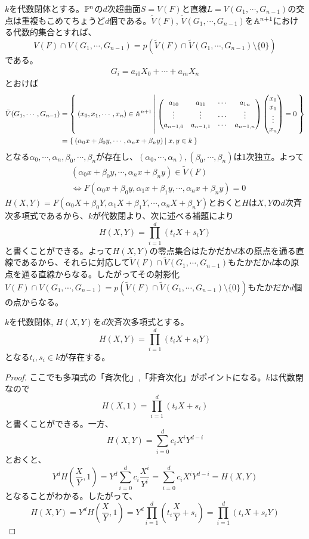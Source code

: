 \documentclass{ltjsreport}
\begin{document}
\begin{eg}
  $k$を代数閉体とする。$\mathbb{P}^n$の$d$次超曲面$S=V(F)$と直線$L=V(G_1,\cdots,G_{n-1})$の交点は重複もこめてちょうど$d$個である。$\tilde{V}(F)$, $\tilde{V}(G_1,\cdots,G_{n-1})$を$\mathbb{A}^{n+1}$における代数的集合とすれば、
  \[
  V(F)\cap V(G_1,\cdots,G_{n-1})=p(\tilde{V}(F)\cap\tilde{V}(G_1,\cdots,G_{n-1})\setminus\{0\})  
  \]
  である。
  \begin{align*}
  G_i=a_{i0}X_0+\cdots+a_{in}X_n  
  \end{align*}
  とおけば
  \begin{align*}
    \tilde{V}(G_1,\cdots,G_{n-1})&=\left\{\:(x_0,x_1,\cdots,x_n)\in \mathbb{A}^{n+1}\:\middle|\:\begin{pmatrix} 
      a_{10} & a_{11} & \cdots & a_{1n}\\
      \vdots & \vdots & \cdots & \vdots \\
      a_{n-1,0} & a_{n-1,1} & \cdots & a_{n-1,n}
       \end{pmatrix}\begin{pmatrix} x_0\\x_1\\\vdots\\x_n \end{pmatrix}=0\:\right\}\\
    &=\left\{\:(\alpha_0x+\beta_0 y,\cdots,\alpha_nx+\beta_ny)\:\middle|\:x,y\in k\:\right\}
  \end{align*}
  となる$\alpha_0,\cdots,\alpha_n,\beta_0,\cdots,\beta_n$が存在し、$(\alpha_0,\cdots,\alpha_n), (\beta_0,\cdots,\beta_n)$は1次独立。よって
  \begin{align*}
    &(\alpha_0x+\beta_0 y,\cdots,\alpha_nx+\beta_ny)\in \tilde{V}(F)\\
    &\Leftrightarrow F(\alpha_0x+\beta_0y,\alpha_1x+\beta_1y,\cdots,\alpha_nx+\beta_ny)=0
  \end{align*}
  $H(X,Y)=F(\alpha_0X+\beta_0Y,\alpha_1X+\beta_1Y,\cdots,\alpha_nX+\beta_nY)$とおくと$H$は$X,Y$の$d$次斉次多項式であるから、$k$が代数閉より、次に述べる補題により
  \[
  H(X,Y)=\prod_{i=1}^d(t_iX+s_iY)  
  \]
  と書くことができる。よって$H(X,Y)$の零点集合はたかだか$d$本の原点を通る直線であるから、それらに対応して$\tilde{V}(F)\cap\tilde{V}(G_1,\cdots,G_{n-1})$もたかだか$d$本の原点を通る直線からなる。したがってその射影化$V(F)\cap V(G_1,\cdots,G_{n-1})=p(\tilde{V}(F)\cap\tilde{V}(G_1,\cdots,G_{n-1})\setminus\{0\})$もたかだか$d$個の点からなる。
\end{eg}

\begin{lemm}
  $k$を代数閉体, $H(X,Y)$を$d$次斉次多項式とする。
  \[
  H(X,Y)=\prod_{i=1}^{d}(t_iX+s_iY)
  \]
  となる$t_i,s_i\in k$が存在する。
\end{lemm}

\begin{proof}
  ここでも多項式の「斉次化」,「非斉次化」がポイントになる。$k$は代数閉なので
  \[
  H(X,1)=\prod_{i=1}^d(t_{i}X+s_i)  
  \]
  と書くことができる。一方、
  \[
  H(X,Y)=\sum_{i=0}^dc_{i}X^iY^{d-i}  
  \]
  とおくと、
  \[
  Y^dH(\frac{X}{Y},1)
  =Y^d\sum_{i=0}^dc_{i}\frac{X^i}{Y^i}  
  =\sum_{i=0}^dc_{i}X^iY^{d-i}=H(X,Y)
  \]
  となることがわかる。したがって、
  \[
  H(X,Y)=Y^dH(\frac{X}{Y},1)=Y^d\prod_{i=1}^d(t_i\frac{X}{Y}+s_i)=\prod_{i=1}^{d}(t_iX+s_iY) 
  \]
\end{proof}
\end{document}
